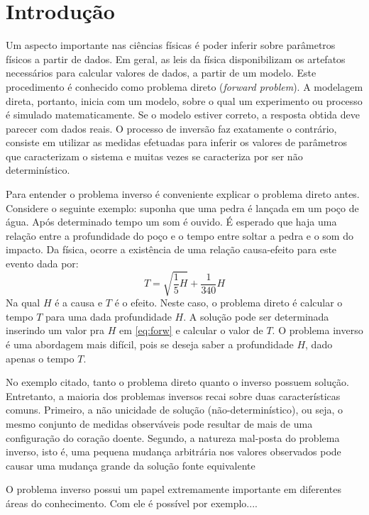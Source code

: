 \chapter{Introdução}
\label{cap:1intro}

Um aspecto importante nas ciências físicas é poder inferir sobre parâmetros
físicos a partir de dados. Em geral, as leis da física disponibilizam os
artefatos necessários para calcular valores de dados, a partir de um modelo.
Este procedimento é conhecido como problema direto (\textit{forward problem}).
A modelagem direta, portanto, inicia com um modelo, sobre o qual um experimento ou processo
é simulado matematicamente. Se o modelo estiver correto, a resposta
obtida deve parecer com dados reais. O processo de inversão faz exatamente o contrário,
consiste em utilizar as medidas efetuadas para inferir os valores de parâmetros que
caracterizam o sistema \citep{tarantola} e muitas vezes se caracteriza
por ser não determinístico.

Para entender o problema inverso é conveniente explicar o problema direto antes.
Considere o seguinte exemplo: suponha que uma pedra é lançada em um poço de água.
Após determinado tempo um som é ouvido. É esperado que haja uma relação entre a
profundidade do poço e o tempo entre soltar a pedra e o som do impacto. Da física,
ocorre a existência de uma relação causa-efeito para este evento dada por:
\begin{equation}
\label{eq:forw}
T = \sqrt{\frac{1}{5}H} + \frac{1}{340}H
\end{equation}
Na qual $H$ é a causa e $T$ é o efeito.
Neste caso, o problema direto é calcular o tempo $T$ para uma dada profundidade $H$.
A solução pode ser determinada inserindo um valor pra $H$ em \ref{eq:forw} e calcular o
valor de $T$. O problema inverso é uma abordagem mais difícil, pois se deseja
saber a profundidade $H$, dado apenas o tempo $T$.

No exemplo citado, tanto o problema direto quanto o inverso possuem solução. Entretanto,
a maioria dos problemas inversos recai sobre duas características
comuns. Primeiro, a não unicidade de solução (não-determinístico), ou seja, o mesmo conjunto de medidas
observáveis pode resultar de mais de uma configuração do coração doente. Segundo,
a natureza mal-posta do problema inverso, isto é, uma pequena mudança arbitrária nos
valores observados pode causar uma mudança grande da solução fonte equivalente

O problema inverso possui um papel extremamente importante em diferentes áreas do conhecimento.
Com ele é possível por exemplo....


